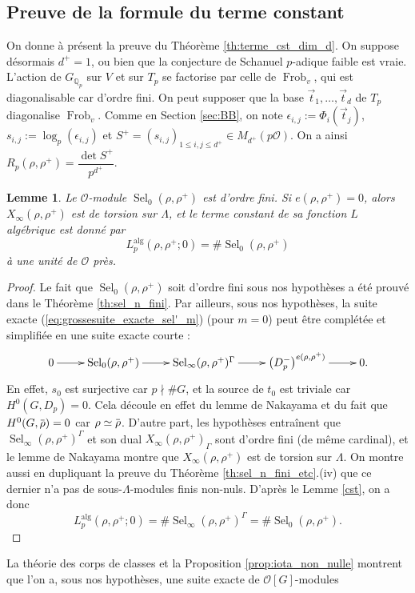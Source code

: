\documentclass[12pt]{amsart}
\newcommand\Qp{\mathbb{Q}_{p}}
\newcommand\cO{\mathcal{O}}
\newcommand{\ob}[1]{\mkern 1.5mu\overline{\mkern-1.5mu#1\mkern-1.5mu}\mkern 1.5mu}
\newcommand{\alg}{\textrm{alg}}
\DeclareMathOperator{\Frob}{Frob}
\DeclareMathOperator{\Sel}{Sel}
\theoremstyle{defstyle}
\theoremstyle{thmstyle}
\newtheorem{lemme}[subsubsection]{Lemme}
\begin{document}
\subsection{Preuve de la formule du terme constant}
\label{sec:preuve_terme_cst}
On donne à présent la preuve du Théorème \ref{th:terme_cst_dim_d}. On suppose désormais $d^+=1$, ou bien que la conjecture de Schanuel $p$-adique faible est vraie. L'action de $G_{\Qp}$ sur $V$ et sur $T_p$ se factorise par celle de $\Frob_v$, qui est diagonalisable car d'ordre fini. On peut supposer que la base $\vec{t}_1,\ldots,\vec{t}_d$ de $T_p$ diagonalise $\Frob_v$. Comme en Section \ref{sec:BB}, on note $\epsilon_{i,j}:=\Phi_i(\vec{t}_j)$, $s_{i,j}:=\log_p(\epsilon_{i,j})$ et $S^+=(s_{i,j})_{1\leq i,j\leq d^+}\in M_{d^+}(p\cO)$. On a ainsi $R_p(\rho,\rho^+)=\dfrac{\det S^+}{p^{d^+}}$.
\begin{lemme}\label{lem:terme-cst}
	Le $\cO$-module $\Sel_0(\rho,\rho^+)$ est d'ordre fini. Si $e(\rho,\rho^+)=0$, alors $X_\infty(\rho,\rho^+)$ est de torsion sur $\Lambda$, et le terme constant de sa fonction $L$ algébrique est donné par 
	$$L_p^{\alg}(\rho,\rho^+;0) = \#\Sel_0(\rho,\rho^+)$$
	à une unité de $\cO$ près.  
\end{lemme}
\begin{proof}
	Le fait que $\Sel_0(\rho,\rho^+)$  soit d'ordre fini sous nos hypothèses a été prouvé dans le Théorème \ref{th:sel_n_fini}. Par ailleurs, sous nos hypothèses, la suite exacte (\ref{eq:grossesuite_exacte_sel'_m}) (pour $m=0$) peut être complétée et simplifiée en une suite exacte courte :
	$$\xymatrix{ 0 \ar[r] & \Sel_0(\rho,\rho^+) \ar[r] & \Sel_\infty(\rho,\rho^+)^{\Gamma} \ar[r] & \left(D_p^-\right)^{e(\rho,\rho^+)} \ar[r] &  0.}$$
	En effet, $s_0$ est surjective car $p\nmid \#G$, et la source de $t_0$ est triviale car $H^0(G,D_p)=0$. Cela découle en effet du lemme de Nakayama et du fait que $H^0(G,\ob{\rho})=0$ car $\rho\simeq\ob{\rho}$. D'autre part, les hypothèses entraînent que $\Sel_\infty(\rho,\rho^+)^{\Gamma}$ et son dual $X_\infty(\rho,\rho^+)_{\Gamma}$ sont d'ordre fini (de même cardinal), et le lemme de Nakayama montre que $X_\infty(\rho,\rho^+)$ est de torsion sur $\Lambda$. On montre aussi en dupliquant la preuve du Théorème \ref{th:sel_n_fini_etc}.(iv) que ce dernier n'a pas de sous-$\Lambda$-modules finis non-nuls. D'après le Lemme \ref{cst}, on a donc 
	$$L_p^{\alg}(\rho,\rho^+;0) = \# \Sel_\infty(\rho,\rho^+)^{\Gamma} = \#\Sel_0(\rho,\rho^+).$$
\end{proof}
La théorie des corps de classes et la Proposition \ref{prop:iota_non_nulle} montrent que l'on a, sous nos hypothèses, une suite exacte de $\cO[G]$-modules
\end{document}
